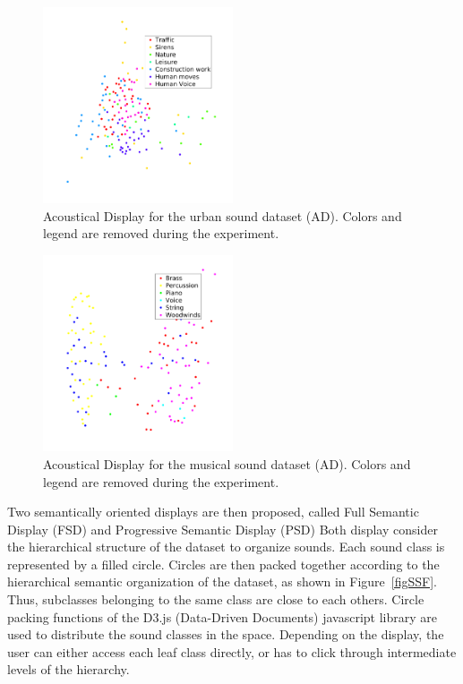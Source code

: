\documentclass{aes2e}
\begin{document}
\begin{figure}[t]
\begin{center}
\includegraphics[width=0.5\textwidth]{gfx/urban_mds.png} 
\end{center}
\caption{\label{figXP3urban} Acoustical Display for the urban sound dataset (AD). Colors and legend are removed during the experiment.}
\end{figure}

\begin{figure}[t]
\begin{center}
\includegraphics[width=0.5\textwidth]{gfx/music_mds.png} 
\end{center}
\caption{\label{figXP3music} Acoustical Display for the musical sound dataset (AD). Colors and legend are removed during the experiment.}
\end{figure}

Two semantically oriented displays are then proposed, called Full Semantic Display (FSD) and Progressive Semantic Display (PSD)%
Both display  consider the hierarchical structure of the dataset to organize sounds. Each sound class is represented by a filled circle. Circles are then packed together according to the hierarchical semantic organization of the dataset, as shown in Figure~\ref{figSSF}. Thus, subclasses belonging to the same class are close to each others. Circle packing functions of the D3.js (Data-Driven Documents) javascript library \cite{2011-d3} are used to distribute the sound classes in the space. Depending on the display, the user can either access each leaf class directly, or has to click through intermediate levels of the hierarchy. 
\end{document}
